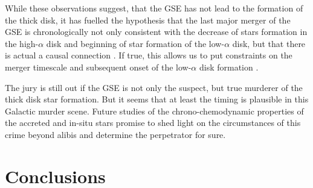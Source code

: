 \documentclass[fleqn,usenatbib]{mnras}
\begin{document}
While these observations suggest, that the GSE has not lead to the formation of the thick disk, it has fuelled the hypothesis that the last major merger of the GSE is chronologically not only consistent with the decrease of stars formation in the high-$\alpha$ disk \citep{Bonaca2020} and beginning of star formation of the low-$\alpha$ disk, but that there is actual a causal connection \citep[see e.g.][]{Buck2020}. If true, this allows us to put constraints on the merger timescale and subsequent onset of the low-$\alpha$ disk formation \citep[e.g.][]{DiMatteo2019,Belokurov2020}.

The jury is still out if the GSE is not only the suspect, but true murderer of the thick disk star formation. But it seems that at least the timing is plausible in this Galactic murder scene. Future studies of the chrono-chemodynamic properties of the accreted and in-situ stars promise to shed light on the circumstances of this crime beyond alibis and determine the perpetrator for sure.

\section{Conclusions} \label{sec:conclusions}
\end{document}
